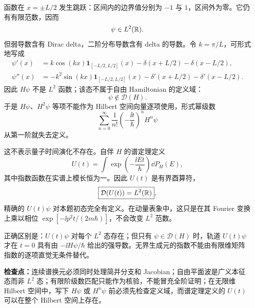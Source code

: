 \begin{checkedsolution}
函数在 $x=\pm L/2$ 发生跳跃：区间内的边界值分别为 $-1$ 与 $1$，区间外为零。它仍有有限范数，因而
\begin{equation}
  \psi\in L^2(\mathbb{R}).
  \label{eq:QM-C05-S01-E04-in-l2}
\end{equation}
但弱导数含有 Dirac delta，二阶分布导数含有 delta 的导数。令 $k=\pi/L$，可形式地写成
\begin{align}
  \psi'(x)
  &=k\cos(kx)\mathbf 1_{[-L/2,L/2]}(x)
  -\delta(x+L/2)-\delta(x-L/2),
  \label{eq:QM-C05-S01-E04-first-distribution-derivative}\\
  \psi''(x)
  &=-k^2\sin(kx)\mathbf 1_{[-L/2,L/2]}(x)
  -\delta'(x+L/2)-\delta'(x-L/2).
  \label{eq:QM-C05-S01-E04-second-distribution-derivative}
\end{align}
因此 $H\psi$ 不是 $L^2$ 函数；该态不属于自由 Hamiltonian 的定义域：
\begin{equation}
  \psi\notin\mathcal D(H).
  \label{eq:QM-C05-S01-E04-not-in-domain}
\end{equation}
于是 $H\psi$、$H^2\psi$ 等项不能作为 Hilbert 空间向量逐项使用，形式幂级数
\begin{equation}
  \sum_{n=0}^{\infty}
  \frac{1}{n!}\left(-\frac{\ii t}{\hbar}\right)^nH^n\psi
  \label{eq:QM-C05-S01-E04-invalid-series}
\end{equation}
从第一阶就失去定义。

这不表示量子时间演化不存在。自伴 $H$ 的谱定理定义
\begin{equation}
  U(t)=\int\exp\left(-\frac{\ii Et}{\hbar}\right)\dd P_H(E),
  \label{eq:QM-C05-S01-E04-spectral-definition}
\end{equation}
其中指数函数在实谱上模长恒为一。因此 $U(t)$ 是有界酉算符，
\begin{equation}
  \boxed{\mathcal D(U(t))=L^2(\mathbb{R})},
  \label{eq:QM-C05-S01-E04-full-domain}
\end{equation}
精确的 $U(t)\psi$ 对本题初态完全有定义。在动量表象中，这只是在其 Fourier 变换上乘以相位 $\exp[-\ii p^2t/(2m\hbar)]$，不会改变 $L^2$ 范数。

正确区别是：$U(t)\psi$ 对每个 $L^2$ 态存在；但只有 $\psi\in\mathcal D(H)$ 时，轨道 $U(t)\psi$ 才在 $t=0$ 具有由 $-\ii H\psi/\hbar$ 给出的强导数。无界生成元的指数不能由有限维矩阵指数的逐项直觉无条件替代。
\end{checkedsolution}

\textbf{检查点：}连续谱换元必须同时处理简并分支和 Jacobian；自由平面波是广义本征态而非 $L^2$ 态；有限阶级数匹配只能作为核验，不能冒充全阶证明；在无限维 Hilbert 空间中，写下 $H\psi$ 或 $H^n\psi$ 前必须先检查定义域，而谱定理定义的 $U(t)$ 可以在整个 Hilbert 空间上存在。

